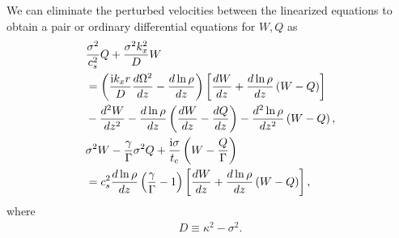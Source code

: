 We can eliminate the perturbed velocities between the linearized
equations to obtain a pair or ordinary differential equations
for $W,Q$ as
\begin{align}
  &\frac{\sigma^2}{c_s^2}Q + \frac{\sigma^2k_x^2}{D}W \notag\\ 
  &=\left(\frac{\mathrm{i}
    k_x r}{D}\frac{d\Omega^2}{dz} -
  \frac{d\ln{\rho}}{dz}\right)\left[\frac{dW}{dz} +
  \frac{d\ln{\rho}}{dz}\left(W-Q\right)\right] \notag\\
&- \frac{d^2W}{dz^2} - \frac{d\ln{\rho}}{dz}\left(\frac{dW}{dz} -
  \frac{dQ}{dz}\right) - \frac{d^2\ln{\rho}}{dz^2}\left(W-Q\right),\label{ode_w}\\
&\sigma^2W - \frac{\gamma}{\Gamma}\sigma^2 Q +
\frac{\mathrm{i}\sigma}{t_c}\left(W-\frac{Q}{\Gamma}\right)\notag\\
&=c_s^2\frac{d\ln{\rho}}{dz}\left(\frac{\gamma}{\Gamma} - 1\right) 
\left[\frac{dW}{dz} + \frac{d\ln{\rho}}{dz}\left(W-Q\right)\right],\label{ode_Q} 
\end{align}
where
\begin{align}
  D \equiv \kappa^2 - \sigma^2.
\end{align}

